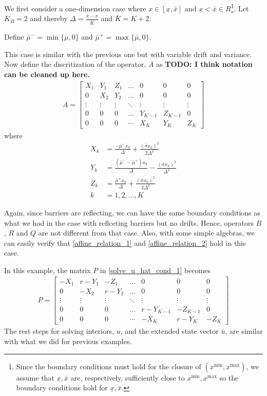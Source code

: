 \documentclass[11pt]{article}
\begin{document}
We first consider a one-dimension case where $x\in [\underline{\textit{\~{x}}}, \bar{\textit{\~{x}}}]$ and $\underline{\textit{\~{x}}} < \bar{\textit{\~{x}}} \in R$\footnote{Since the boundary conditions must hold for the closure of $(x^{\min},x^{\max})$, we assume that $\underline{\textit{\~{x}}}, \bar{\textit{\~{x}}}$ are, respectively, sufficiently close to $x^{\min}, x^{\max}$ so the boundary conditions hold for $\underline{\textit{\~{x}}}, \bar{\textit{\~{x}}}$.}. Let $K_B = 2$ and thereby $\Delta  = \frac{\bar{\textit{\~{x}}} - \underline{\textit{\~{x}}}}{\bar{K}}$ and $\bar{K} = K+2$.

Define $\bar{\mu}^- = \min\{\bar{\mu}, 0\}$ and $\bar{\mu}^+  = \max\{\bar{\mu}, 0\}$.

This case is similar with the previous one but with variable drift and variance. Now define the discritization of the operator, $A$ as \textbf{TODO: I think notation can be cleaned up here.}
\begin{align}
A = \begin{bmatrix}
X_1&Y_1&Z_1&\dots&0&0&0\\
0&X_2&Y_2&\dots&0&0&0\\
\vdots&\vdots&\vdots&\ddots&\vdots&\vdots&\vdots\\
0&0&0&\dots&Y_{K-1}&Z_{K-1}&0\\
0&0&0&\cdots&X_{K}&Y_{K}&Z_{K}
\end{bmatrix}
\end{align}
where
\begin{align*}
X_k &= \frac{-\bar{\mu}^-x_k}{\Delta}+\frac{(\bar{\sigma}x_k)^2}{2\Delta^2}\\
Y_k &= \frac{(\bar{\mu}^--\bar{\mu}^+)x_k}{\Delta}-\frac{(\bar{\sigma}x_k)^2}{\Delta^2}\\
Z_k &=\frac{\bar{\mu}^+x_k}{\Delta}+\frac{(\bar{\sigma}x_k)^2}{2\Delta^2}\\
k & = 1, 2,\dots, K
\end{align*}

Again, since barriers are reflecting, we can have the same boundary conditions as what we had in the case with reflceting barriers but no drifts. Hence, operators $B$, $R$ and $Q$ are not different from that case. Also, with some simple algebras, we can easily verify that \eqref{affine_relation_1} and \eqref{affine_relation_2} hold in this case.

In this example, the matrix $P$ in \eqref{solve_u_hat_cond_1} becomes
\begin{align}
P = \begin{bmatrix}
-X_1&r-Y_1&-Z_1&\dots&0&0&0\\
0&-X_2&r-Y_2&\dots&0&0&0\\
\vdots&\vdots&\vdots&\ddots&\vdots&\vdots&\vdots\\
0&0&0&\dots&r-Y_{K-1}&-Z_{K-1}&0\\
0&0&0&\cdots&-X_K&r-Y_K&-Z_K
\end{bmatrix}
\end{align}
The rest steps for solving interiors, $u$, and the extended state vector $\bar{u}$, are similar with what we did for previous examples.
\end{document}
